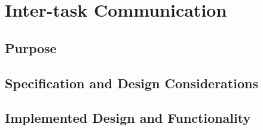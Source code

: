 \section{Inter-task Communication}
\subsection{Purpose}
\subsection{Specification and Design Considerations}
\subsection{Implemented Design and Functionality}